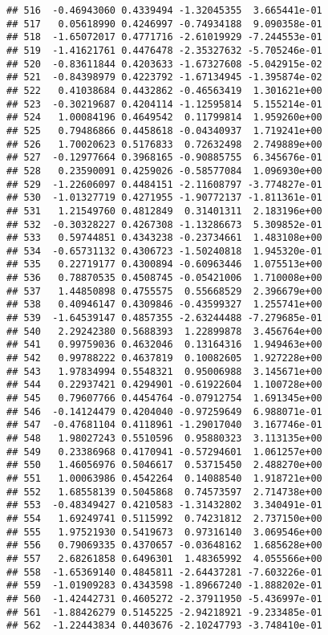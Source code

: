 \documentclass[
]{article}
\begin{document}
\begin{verbatim}
## 516  -0.46943060 0.4339494 -1.32045355  3.665441e-01
## 517   0.05618990 0.4246997 -0.74934188  9.090358e-01
## 518  -1.65072017 0.4771716 -2.61019929 -7.244553e-01
## 519  -1.41621761 0.4476478 -2.35327632 -5.705246e-01
## 520  -0.83611844 0.4203633 -1.67327608 -5.042915e-02
## 521  -0.84398979 0.4223792 -1.67134945 -1.395874e-02
## 522   0.41038684 0.4432862 -0.46563419  1.301621e+00
## 523  -0.30219687 0.4204114 -1.12595814  5.155214e-01
## 524   1.00084196 0.4649542  0.11799814  1.959260e+00
## 525   0.79486866 0.4458618 -0.04340937  1.719241e+00
## 526   1.70020623 0.5176833  0.72632498  2.749889e+00
## 527  -0.12977664 0.3968165 -0.90885755  6.345676e-01
## 528   0.23590091 0.4259026 -0.58577084  1.096930e+00
## 529  -1.22606097 0.4484151 -2.11608797 -3.774827e-01
## 530  -1.01327719 0.4271955 -1.90772137 -1.811361e-01
## 531   1.21549760 0.4812849  0.31401311  2.183196e+00
## 532  -0.30328227 0.4267308 -1.13286673  5.309852e-01
## 533   0.59744851 0.4343238 -0.23734661  1.483108e+00
## 534  -0.65731132 0.4306723 -1.50240818  1.945320e-01
## 535   0.22719177 0.4300894 -0.60963446  1.075513e+00
## 536   0.78870535 0.4508745 -0.05421006  1.710008e+00
## 537   1.44850898 0.4755575  0.55668529  2.396679e+00
## 538   0.40946147 0.4309846 -0.43599327  1.255741e+00
## 539  -1.64539147 0.4857355 -2.63244488 -7.279685e-01
## 540   2.29242380 0.5688393  1.22899878  3.456764e+00
## 541   0.99759036 0.4632046  0.13164316  1.949463e+00
## 542   0.99788222 0.4637819  0.10082605  1.927228e+00
## 543   1.97834994 0.5548321  0.95006988  3.145671e+00
## 544   0.22937421 0.4294901 -0.61922604  1.100728e+00
## 545   0.79607766 0.4454764 -0.07912754  1.691345e+00
## 546  -0.14124479 0.4204040 -0.97259649  6.988071e-01
## 547  -0.47681104 0.4118961 -1.29017040  3.167746e-01
## 548   1.98027243 0.5510596  0.95880323  3.113135e+00
## 549   0.23386968 0.4170941 -0.57294601  1.061257e+00
## 550   1.46056976 0.5046617  0.53715450  2.488270e+00
## 551   1.00063986 0.4542264  0.14088540  1.918721e+00
## 552   1.68558139 0.5045868  0.74573597  2.714738e+00
## 553  -0.48349427 0.4210583 -1.31432802  3.340491e-01
## 554   1.69249741 0.5115992  0.74231812  2.737150e+00
## 555   1.97521930 0.5419673  0.97316140  3.069546e+00
## 556   0.79069335 0.4370657 -0.03648162  1.685628e+00
## 557   2.68261858 0.6496301  1.48365992  4.055566e+00
## 558  -1.65369140 0.4845811 -2.64437281 -7.603226e-01
## 559  -1.01909283 0.4343598 -1.89667240 -1.888202e-01
## 560  -1.42442731 0.4605272 -2.37911950 -5.436997e-01
## 561  -1.88426279 0.5145225 -2.94218921 -9.233485e-01
## 562  -1.22443834 0.4403676 -2.10247793 -3.748410e-01

\end{verbatim}
\end{document}
